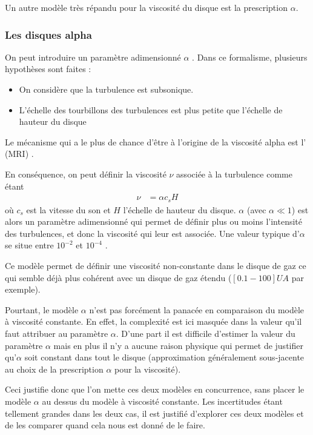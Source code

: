 Un autre modèle très répandu pour la viscosité du disque est la prescription $\alpha$.

\subsubsection{Les disques alpha}\label{sec:viscosite-alpha}
On peut introduire un paramètre adimensionné $\alpha$ \citep{shakura1973black}. Dans ce formalisme, plusieurs hypothèses sont faites : 
\begin{itemize}
\item On considère que la turbulence est subsonique.
\item L'échelle des tourbillons des turbulences est plus petite que l'échelle de hauteur du disque
\end{itemize}
Le mécanisme qui a le plus de chance d'être à l'origine de la viscosité alpha est l' (MRI) \citep{balbus1991powerful}. 

\bigskip

En conséquence, on peut définir la viscosité $\nu$ associée à la turbulence comme étant 
\begin{align}
\nu &= \alpha c_s H
\end{align}
où $c_s$ est la vitesse du son et $H$ l'échelle de hauteur du disque. $\alpha$ (avec $\alpha \ll 1$) est alors un paramètre adimensionné qui permet de définir plus ou moins l'intensité des turbulences, et donc la viscosité qui leur est associée. Une valeur typique d'$\alpha$ se situe entre $10^{-2}$ et $10^{-4}$ \citep{guilloteau2011dual}.

Ce modèle permet de définir une viscosité non-constante dans le disque de gaz ce qui semble déjà plus cohérent avec un disque de gaz étendu ($[0.1-100]\unit{UA}$ par exemple). 

Pourtant, le modèle $\alpha$ n'est pas forcément la panacée en comparaison du modèle à viscosité constante. En effet, la complexité est ici masquée dans la valeur qu'il faut attribuer au paramètre $\alpha$. D'une part il est difficile d'estimer la valeur du paramètre $\alpha$ mais en plus il n'y a aucune raison physique qui permet de justifier qu'$\alpha$ soit constant dans tout le disque (approximation généralement sous-jacente au choix de la prescription $\alpha$ pour la viscosité).

Ceci justifie donc que l'on mette ces deux modèles en concurrence, sans placer le modèle $\alpha$ au dessus du modèle à viscosité constante. Les incertitudes étant tellement grandes dans les deux cas, il est justifié d'explorer ces deux modèles et de les comparer quand cela nous est donné de le faire.

